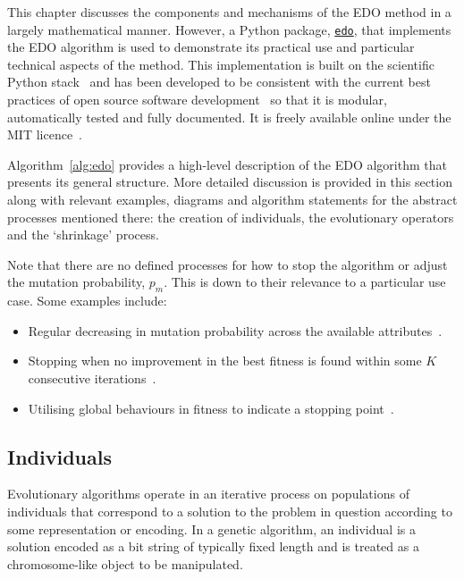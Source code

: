 This chapter discusses the components and mechanisms of the EDO method in a
largely mathematical manner. However, a Python package,
\href{https://github.com/daffidwilde/edo}{\texttt{edo}}, that
implements the EDO algorithm is used to demonstrate its practical use and
particular technical aspects of the method. This implementation is built on the
scientific Python stack~\cite{pandas,numpy} and has been developed to be
consistent with the current best practices of open source software
development~\cite{Jimenez2017} so that it is modular, automatically tested and
fully documented. It is freely available online under the MIT
licence~\cite{edo-project}.

Algorithm~\ref{alg:edo} provides a high-level description of the EDO algorithm
that presents its general structure. More detailed discussion is provided in
this section along with relevant examples, diagrams and algorithm statements for
the abstract processes mentioned there: the creation of individuals, the
evolutionary operators and the `shrinkage' process.


Note that there are no defined processes for how to stop the
algorithm or adjust the mutation probability, \(p_m\). This is down to their
relevance to a particular use case. Some examples include:
\begin{itemize}
    \item Regular decreasing in mutation probability across the available
        attributes~\cite{Kuehn2013}.
    \item Stopping when no improvement in the best fitness is found within some
        \(K\) consecutive iterations~\cite{Leung2001}.
    \item Utilising global behaviours in fitness to indicate a stopping
        point~\cite{Marti2016}.
\end{itemize}


\subsection{Individuals}

Evolutionary algorithms operate in an iterative process on populations of
individuals that correspond to a solution to the problem in question according
to some representation or encoding. In a genetic algorithm, an individual is a
solution encoded as a bit string of typically fixed length and is treated as a
chromosome-like object to be manipulated.

